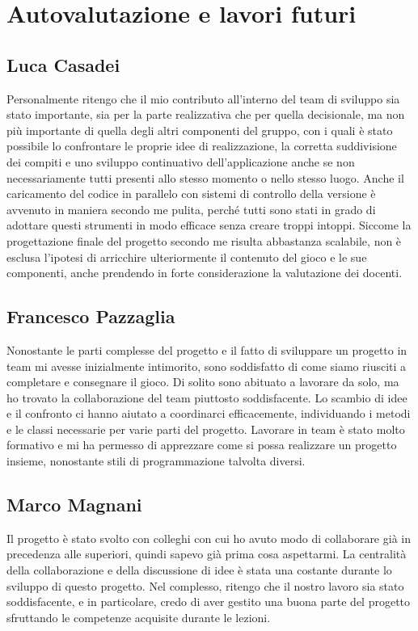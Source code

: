 \documentclass[a4paper,12pt]{report}
\begin{document}
\section{Autovalutazione e lavori futuri}

\subsection{Luca Casadei}
Personalmente ritengo che il mio contributo all'interno del team di sviluppo sia stato importante, sia per la parte realizzativa che per quella decisionale, ma non più importante di quella degli altri componenti del gruppo, con i quali è stato possibile lo confrontare le proprie idee di realizzazione, la corretta suddivisione dei compiti e uno sviluppo continuativo dell'applicazione anche se non necessariamente tutti presenti allo stesso momento o nello stesso luogo. Anche il caricamento del codice in parallelo con sistemi di controllo della versione è avvenuto in maniera secondo me pulita, perché tutti sono stati in grado di adottare questi strumenti in modo efficace senza creare troppi intoppi. Siccome la progettazione finale del progetto secondo me risulta abbastanza scalabile, non è esclusa l'ipotesi di arricchire ulteriormente il contenuto del gioco e le sue componenti, anche prendendo in forte considerazione la valutazione dei docenti.

\subsection{Francesco Pazzaglia}

Nonostante le parti complesse del progetto e il fatto di sviluppare un progetto in team mi avesse inizialmente intimorito, sono soddisfatto di come siamo riusciti a completare e consegnare il gioco. Di solito sono abituato a lavorare da solo, ma ho trovato la collaborazione del team piuttosto soddisfacente. Lo scambio di idee e il confronto ci hanno aiutato a coordinarci efficacemente, individuando i metodi e le classi necessarie per varie parti del progetto. Lavorare in team è stato molto formativo e mi ha permesso di apprezzare come si possa realizzare un progetto insieme, nonostante stili di programmazione talvolta diversi.

\subsection{Marco Magnani}
Il progetto è stato svolto con colleghi con cui ho avuto modo di collaborare già in precedenza alle superiori, quindi sapevo già prima cosa aspettarmi. La centralità della collaborazione e della discussione di idee è stata una costante durante lo sviluppo di questo progetto. Nel complesso, ritengo che il nostro lavoro sia stato soddisfacente, e in particolare, credo di aver gestito una buona parte del progetto sfruttando le competenze acquisite durante le lezioni.
\end{document}
